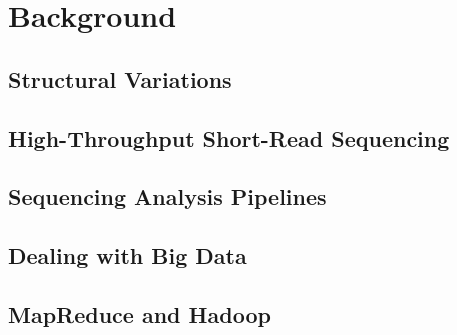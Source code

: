 \chapter{Background}\label{chap_background}

\section{Structural Variations}

\section{High-Throughput Short-Read Sequencing}

\section{Sequencing Analysis Pipelines}

\section{Dealing with Big Data}

\section{MapReduce and Hadoop}\label{section_hadoop_description}